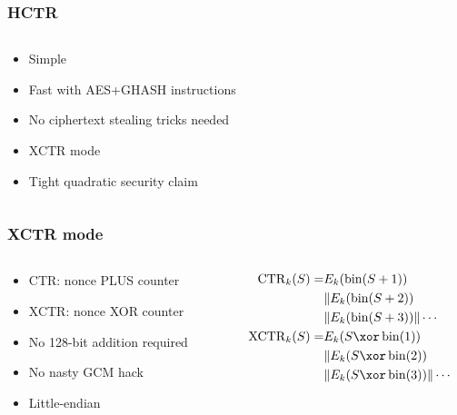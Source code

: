 \documentclass[aspectratio=169]{beamer}
\newenvironment*{figslide}{
    \begin{columns}
        \begin{column}{.4\textwidth}

}{
\end{column}
\begin{column}{.6\textwidth}
    \begin{figure}
        
    \end{figure}
\end{column}
\end{columns}
}
\begin{document}
\toggletrue{oldhctr}

\begin{frame}

\frametitle{HCTR}

    \begin{figslide}
        \begin{itemize}
            \item Simple
            \item Fast with AES+GHASH instructions
            \item No ciphertext stealing tricks needed
            \item XCTR mode
            \item Tight quadratic security claim
        \end{itemize}
    \end{figslide}
\end{frame}

\begin{frame}
    \frametitle{XCTR mode}
    \begin{columns}
        \begin{column}{.4\textwidth}
            \begin{itemize}
                \item CTR: nonce PLUS counter
                \item XCTR: nonce XOR counter
                \item No 128-bit addition required
                \item No nasty GCM hack
                \item Little-endian
            \end{itemize}
        \end{column}
        \begin{column}{.6\textwidth}
            \begin{align*}
                \operatorname{CTR}_k(S) =& E_k(\fromint(S + 1)) \\
                & \Concat  E_k(\fromint(S + 2)) \\ 
                & \Concat  E_k(\fromint(S + 3)) \Concat \cdots \\
                \XCTR_k(S) =& E_k(S \xor \fromint(1)) \\
                & \Concat  E_k(S \xor \fromint(2)) \\ 
                & \Concat  E_k(S \xor \fromint(3)) \Concat \cdots \\
            \end{align*}
        \end{column}
    \end{columns}
\end{frame}
\end{document}
